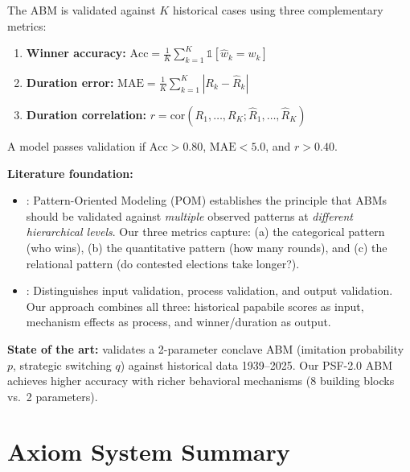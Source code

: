 \begin{tcolorbox}[colback=blue!3!white, colframe=blue!60!black, title=Axiom VTM-8: Multi-Pattern Validation]
The ABM is validated against $K$ historical cases using three complementary metrics:
\begin{enumerate}[nosep]
\item \textbf{Winner accuracy:} $\text{Acc} = \frac{1}{K}\sum_{k=1}^{K} \mathbb{1}[\hat{w}_k = w_k]$
\item \textbf{Duration error:} $\text{MAE} = \frac{1}{K}\sum_{k=1}^{K} |R_k - \hat{R}_k|$
\item \textbf{Duration correlation:} $r = \text{cor}(R_1, \ldots, R_K; \hat{R}_1, \ldots, \hat{R}_K)$
\end{enumerate}
A model passes validation if $\text{Acc} > 0.80$, $\text{MAE} < 5.0$, and $r > 0.40$.
\end{tcolorbox}

\textbf{Literature foundation:}
\begin{itemize}[nosep]
\item \citet{grimm2005pattern}: Pattern-Oriented Modeling (POM) establishes the
      principle that ABMs should be validated against \emph{multiple} observed patterns
      at \emph{different hierarchical levels}. Our three metrics capture:
      (a) the categorical pattern (who wins),
      (b) the quantitative pattern (how many rounds), and
      (c) the relational pattern (do contested elections take longer?).
\item \citet{windrum2007empirical}: Distinguishes input validation, process validation,
      and output validation. Our approach combines all three: historical papabile scores
      as input, mechanism effects as process, and winner/duration as output.
\end{itemize}

\textbf{State of the art:} \citet{crokidakis2025conclave} validates a 2-parameter
conclave ABM (imitation probability $p$, strategic switching $q$) against historical
data 1939--2025. Our PSF-2.0 ABM achieves higher accuracy with richer behavioral
mechanisms (8 building blocks vs.\ 2 parameters).


\section{Axiom System Summary}
\label{sec:bp-axioms}

